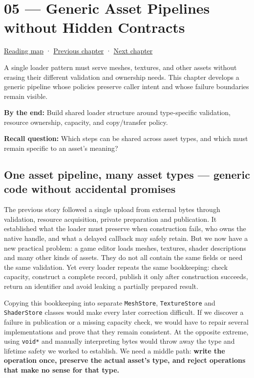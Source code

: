 \hypertarget{01-foundations-i-ch005}{}
\section{05 --- Generic Asset Pipelines without Hidden Contracts}\label{generic-asset-pipelines-without-hidden-contracts}

\href{Chapter\%20Edition/01\%20-\%20Computing\%20Foundations/00\%20-\%20Reading\%20Map}{Reading map} · \hyperref[01-foundations-i-ch004]{Previous chapter} · \hyperref[01-foundations-i-ch006]{Next chapter}

A single loader pattern must serve meshes, textures, and other assets without erasing their different validation and ownership needs. This chapter develops a generic pipeline whose policies preserve caller intent and whose failure boundaries remain visible.

\textbf{By the end:} Build shared loader structure around type-specific validation, resource ownership, capacity, and copy/transfer policy.

\textbf{Recall question:} Which steps can be shared across asset types, and which must remain specific to an asset's meaning?

\subsection{One asset pipeline, many asset types --- generic code without accidental promises}\label{one-asset-pipeline-many-asset-types-generic-code-without-accidental-promises}

The previous story followed a single upload from external bytes through validation, resource acquisition, private preparation and publication. It established what the loader must preserve when construction fails, who owns the native handle, and what a delayed callback may safely retain. But we now have a new practical problem: a game editor loads meshes, textures, shader descriptions and many other kinds of assets. They do not all contain the same fields or need the same validation. Yet every loader repeats the same bookkeeping: check capacity, construct a complete record, publish it only after construction succeeds, return an identifier and avoid leaking a partially prepared result.

Copying this bookkeeping into separate \texttt{MeshStore}, \texttt{TextureStore} and \texttt{ShaderStore} classes would make every later correction difficult. If we discover a failure in publication or a missing capacity check, we would have to repair several implementations and prove that they remain consistent. At the opposite extreme, using \texttt{void*} and manually interpreting bytes would throw away the type and lifetime safety we worked to establish. We need a middle path: \textbf{write the operation once, preserve the actual asset's type, and reject operations that make no sense for that type.}

